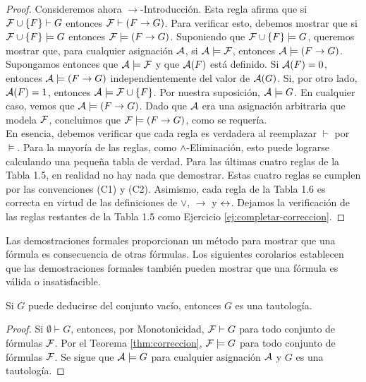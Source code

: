 \message{ !name(main.tex)}\documentclass[12pt,a4paper]{book}
\begin{document}
\begin{proof}
        Consideremos ahora $\rightarrow$-Introducción. Esta regla afirma que si $\FF\cup\{F\}\vdash G$ entonces
        $\FF\vdash(F\rightarrow G)$. Para verificar esto, debemos mostrar que si $\FF\cup\{F\}\models G$ entonces
        $\FF\models(F\rightarrow G)$. Suponiendo que $\FF\cup\{F\}\models G$, queremos mostrar que, para cualquier asignación
        $\AA$, si $\AA\models\FF$, entonces $\AA\models(F\rightarrow G)$.\\
        Supongamos entonces que $\AA\models\FF$ y que $\AA(F)$ está definido. Si $\AA(F)=0$, entonces $\AA\models(F\rightarrow G)$
        independientemente del valor de $\AA(G)$. Si, por otro lado, $\AA(F)=1$, entonces $\AA\models\FF\cup\{F\}$. Por nuestra
        suposición, $\AA\models G$. En cualquier caso, vemos que $\AA\models(F\rightarrow G)$. Dado que $\AA$ era una asignación
        arbitraria que modela $\FF$, concluimos que $\FF\models(F\rightarrow G)$, como se requería.\\
        En esencia, debemos verificar que cada regla es verdadera al reemplazar $\vdash$ por $\models$. Para la mayoría de las
        reglas, como $\wedge$-Eliminación, esto puede lograrse calculando una pequeña tabla de verdad. Para las últimas cuatro
        reglas de la Tabla 1.5, en realidad no hay nada que demostrar. Estas cuatro reglas se cumplen por las convenciones (C1) y
        (C2). Asimismo, cada regla de la Tabla 1.6 es correcta en virtud de las definiciones de $\vee$, $\rightarrow$ y $\ssi$.
        Dejamos la verificación de las reglas restantes de la Tabla 1.5 como Ejercicio \ref{ej:completar-correccion}.
    \end{proof}

    Las demostraciones formales proporcionan un método para mostrar que una fórmula es consecuencia de otras fórmulas. Los
    siguientes corolarios establecen que las demostraciones formales también pueden mostrar que una fórmula es válida o
    insatisfacible.

    \begin{corolario}\label{cor:tautologia-formal}
        Si $G$ puede deducirse del conjunto vacío, entonces $G$ es una tautología.
    \end{corolario}
    \begin{proof}
        Si $\emptyset\vdash G$, entonces, por Monotonicidad, $\FF\vdash G$ para todo conjunto de fórmulas $\FF$. Por el
        Teorema \ref{thm:correccion}, $\FF\models G$ para todo conjunto de fórmulas $\FF$. Se sigue que $\AA\models G$ para
        cualquier asignación $\AA$ y $G$ es una tautología.
    \end{proof}
\end{document}
